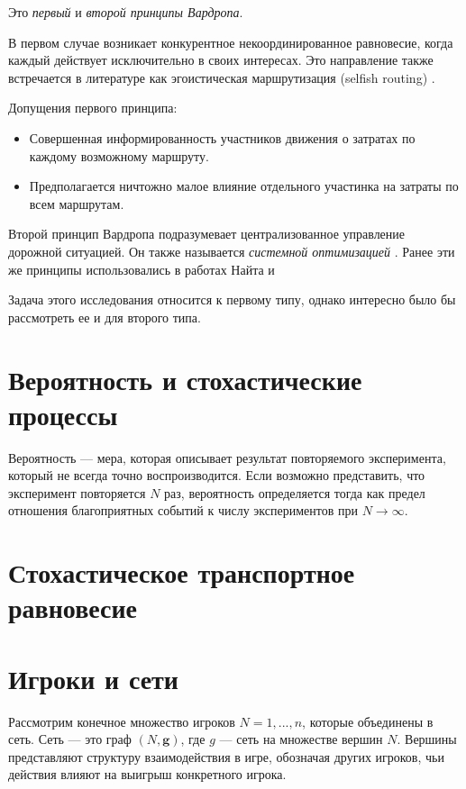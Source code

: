 Это \textit{первый} и \textit{второй принципы Вардропа}.

В первом случае возникает конкурентное некоординированное равновесие, когда каждый действует исключительно в своих интересах. Это направление также встречается в литературе как эгоистическая маршрутизация (selfish routing) \cite[3]{rough2005}.

Допущения первого принципа:
\begin{itemize}
	\item Совершенная информированность участников движения о затратах по каждому возможному маршруту.
	\item Предполагается ничтожно малое влияние отдельного участинка на затраты по всем маршрутам.
\end{itemize}

Второй принцип Вардропа подразумевает централизованное управление дорожной ситуацией. Он также называется \textit{системной оптимизацией} \cite[26-27]{gas}. Ранее эти же принципы использовались в работах Найта \cite{knight} и 

Задача этого исследования относится к первому типу, однако интересно было бы рассмотреть ее и для второго типа. 


\section{Вероятность и стохастические процессы}

Вероятность --- мера, которая описывает результат повторяемого эксперимента, который не всегда точно воспроизводится. Если возможно представить, что эксперимент повторяется $N$ раз, вероятность определяется тогда как предел отношения благоприятных событий к числу экспериментов при $N\to\infty$.


\section{Стохастическое транспортное равновесие} \cite[316, Ю. Е. Нестеров, С. В. Шпирко]{gas}

\section{Игроки и сети} \cite[4]{GandN}

Рассмотрим конечное множество игроков $N = {1,...,n}$, которые объединены в сеть. 
Сеть --- это граф $(N, \mathbf{g})$, где $g$ --- сеть на множестве вершин $N$.
Вершины представляют структуру взаимодействия в игре, обозначая других игроков, чьи действия влияют на выигрыш конкретного игрока.

